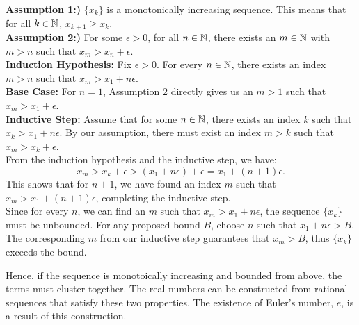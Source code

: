 \textbf{Assumption 1:)}  \( \{x_k\} \) is a monotonically increasing sequence. This means that for all \( k \in \mathbb N \), \( x_{k+1} \geq x_k \).\\

\textbf{Assumption 2:)}  For some \( \epsilon > 0 \), for all \( n \in \mathbb N \), there exists an \( m \in \mathbb N \) with \( m > n \) such that \( x_m > x_n + \epsilon \).\\

\textbf{Induction Hypothesis:} Fix \( \epsilon > 0 \). For every \( n \in \mathbb N \), there exists an index \( m >n \) such that \( x_m > x_1 + n\epsilon \).\\

\textbf{Base Case:} For \( n = 1 \), Assumption 2 directly gives us an \( m > 1 \) such that \( x_m > x_1 + \epsilon \).\\

\textbf{Inductive Step:} Assume that for some \( n \in \mathbb N \), there exists an index \( k \) such that \( x_k > x_1 + n\epsilon \). By our assumption, there must exist an index \( m > k \) such that \( x_m > x_k + \epsilon \).\\

From the induction hypothesis and the inductive step, we have:
   \[
   x_m > x_k + \epsilon > (x_1 + n\epsilon) + \epsilon = x_1 + (n+1)\epsilon.
   \]
This shows that for \( n+1 \), we have found an index \( m \) such that \( x_m > x_1 + (n+1)\epsilon \), completing the inductive step.\\

Since for every \( n \), we can find an \( m \) such that \( x_m > x_1 + n\epsilon \), the sequence \( \{x_k\} \) must be unbounded. For any proposed bound \( B \), choose \( n \) such that \( x_1 + n\epsilon > B \). The corresponding \( m \) from our inductive step guarantees that \( x_m > B \), thus \( \{x_k\} \) exceeds the bound.

\Qed

Hence, if the sequence is monotoically increasing and bounded from above, the terms must cluster together. The real numbers can be constructed from rational sequences that satisfy these two properties. The existence of Euler's number, $e$, is a result of this construction.




